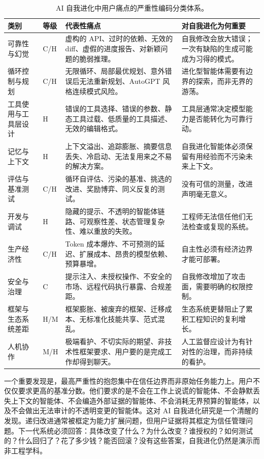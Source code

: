 \begin{table}[t]
\centering
\scriptsize
\setlength{\tabcolsep}{2pt}
\renewcommand{\arraystretch}{1.08}
\caption{AI 自我进化中用户痛点的严重性编码分类体系。}
\label{tab:pain-taxonomy}
\begin{tabularx}{\textwidth}{@{}L{0.16\textwidth}L{0.07\textwidth}L{0.32\textwidth}Y@{}}
\toprule
\textbf{类别} & \textbf{等级} & \textbf{代表性痛点} & \textbf{对自我进化为何重要} \\
\midrule
可靠性与幻觉 & C/H & 虚构的 API、过时的依赖、无效的 diff、虚假的进度报告、对新颖问题的脆弱推理。 & 自我修改会放大错误；一次有缺陷的生成可能成为习得的模式。 \\
循环控制与规划 & C/H & 无限循环、局部最优规划、意外错误后无法重新规划、AutoGPT 风格连续模式风险。 & 进化型智能体需要有边界的探索，而非无界的游荡。 \\
工具使用与工具层设计 & H & 错误的工具选择、错误的参数、静态工具过载、低质量的工具描述、无效的编辑格式。 & 工具层通常决定模型能力是否能转化为可靠行动。 \\
记忆与上下文 & H & 上下文溢出、追踪膨胀、摘要信息丢失、冷启动、无法复用来之不易的解决方案。 & 自我进化智能体必须保留有用经验而不污染未来上下文。 \\
评估与基准测试 & C/H & 循环自评估、污染的基准、挑选的改进、奖励博弈、同义反复的测试。 & 没有可信的测量，改进声明毫无意义。 \\
开发与调试 & H & 隐藏的提示、不透明的智能体链路、可观察性差、状态管理复杂性、难以重放的失败。 & 工程师无法信任他们无法检查或复现的系统。 \\
生产经济性 & C/H & Token 成本爆炸、不可预测的延迟、扩展成本、昂贵的模型依赖、预算暴增。 & 自主性必须有经济边界才能可部署。 \\
安全与治理 & C & 提示注入、未授权操作、不安全的市场、远程代码执行暴露、合规差距。 & 自我修改增加了攻击面，需要明确的权限控制。 \\
框架与生态系统差距 & H/M & 框架膨胀、被废弃的框架、迁移成本、无标准化技能共享、范式混乱。 & 生态系统更替阻止了累积工程知识的复利增长。 \\
人机协作 & M/H & 极端看护、不切实际的期望、非技术性框架要求、用户要的是完成工作却得到聊天。 & 人工监督应设计为有针对性的治理，而非持续的看护。 \\
\bottomrule
\end{tabularx}
\end{table}

一个重要发现是，最高严重性的抱怨集中在信任边界而非原始任务能力上。用户不仅仅要求更高的基准分数。他们要求的是不会在工作上说谎的智能体、不会静默丢失上下文的智能体、不会编造外部证据的智能体、不会消耗无界预算的智能体，以及不会做出无法审计的不透明变更的智能体。这对 AI 自我进化研究是一个清醒的发现。递归改进通常被框定为能力扩展问题，但用户证据将其框定为信任管理问题。下一代系统必须回答：具体改变了什么？为什么改变？谁授权的？如何测试的？什么回归了？花了多少钱？能否回滚？没有这些答案，自我进化仍然是演示而非工程学科。

